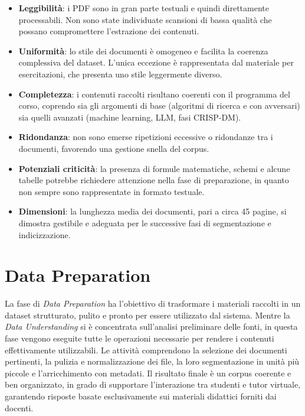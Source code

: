 \documentclass[a4paper,9pt]{article}
\begin{document}
\begin{itemize}
	\item \textbf{Leggibilità}: i PDF sono in gran parte testuali e quindi direttamente processabili. Non sono state individuate scansioni di bassa qualità che possano compromettere l’estrazione dei contenuti.
	\item \textbf{Uniformità}: lo stile dei documenti è omogeneo e facilita la coerenza complessiva del dataset. L’unica eccezione è rappresentata dal materiale per esercitazioni, che presenta uno stile leggermente diverso.
	\item \textbf{Completezza}: i contenuti raccolti risultano coerenti con il programma del corso, coprendo sia gli argomenti di base (algoritmi di ricerca e con avversari) sia quelli avanzati (machine learning, LLM, fasi CRISP-DM).
	\item \textbf{Ridondanza}: non sono emerse ripetizioni eccessive o ridondanze tra i documenti, favorendo una gestione snella del corpus.
	\item \textbf{Potenziali criticità}: la presenza di formule matematiche, schemi e alcune tabelle potrebbe richiedere attenzione nella fase di preparazione, in quanto non sempre sono rappresentate in formato testuale.
	\item \textbf{Dimensioni}: la lunghezza media dei documenti, pari a circa 45 pagine, si dimostra gestibile e adeguata per le successive fasi di segmentazione e indicizzazione.
\end{itemize}

\section{Data Preparation}
La fase di \textit{Data Preparation} ha l’obiettivo di trasformare i materiali raccolti in un dataset strutturato, pulito e pronto per essere utilizzato dal sistema.  
Mentre la \textit{Data Understanding} si è concentrata sull’analisi preliminare delle fonti, in questa fase vengono eseguite tutte le operazioni necessarie per rendere i contenuti effettivamente utilizzabili.  
Le attività comprendono la selezione dei documenti pertinenti, la pulizia e normalizzazione dei file, la loro segmentazione in unità più piccole e l’arricchimento con metadati.  
Il risultato finale è un corpus coerente e ben organizzato, in grado di supportare l’interazione tra studenti e tutor virtuale, garantendo risposte basate esclusivamente sui materiali didattici forniti dai docenti.
\end{document}
